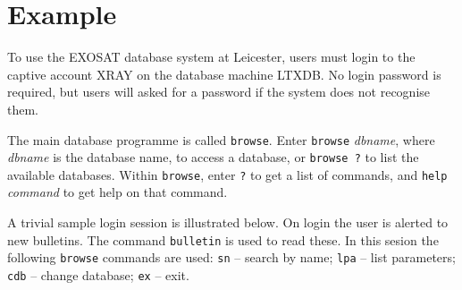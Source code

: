 \documentclass[nolof,11pt]{starlink}
\begin{document}
\section{Example}

To use the EXOSAT database system at Leicester, users must login to the
captive account XRAY on the database machine LTXDB. No login password is
required, but users will asked for a password if the system does not recognise
them.

The main database programme is called \texttt{browse}.
Enter \texttt{browse} \textit{dbname},
where \textit{dbname} is the database name, to access a database, or \texttt{browse ?}
to list the available databases. Within \texttt{browse},
enter \texttt{?} to get a list
of commands, and \texttt{help} \textit{command} to get help on that command.

A trivial sample login session is illustrated below. On login the user is
alerted to new bulletins. The command \texttt{bulletin} is used to read these.
In this sesion the following
\texttt{browse} commands are used: \texttt{sn} -- search by name;
\texttt{lpa} -- list parameters; \texttt{cdb} -- change database; \texttt{ex} -- exit.
\end{document}
